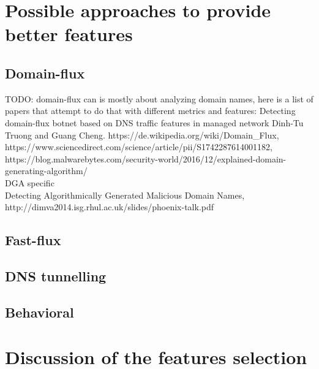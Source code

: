 \section{Possible approaches to provide better features}
\subsection{Domain-flux}
TODO: domain-flux can is mostly about analyzing domain names, here is a list of papers that attempt to do that with different metrics and features:  Detecting domain-flux botnet based on DNS traffic features in managed network Dinh-Tu Truong and Guang Cheng. https://de.wikipedia.org/wiki/Domain\_Flux, https://www.sciencedirect.com/science/article/pii/S1742287614001182, https://blog.malwarebytes.com/security-world/2016/12/explained-domain-generating-algorithm/\\
DGA specific\\
Detecting Algorithmically Generated Malicious Domain Names, http://dimva2014.isg.rhul.ac.uk/slides/phoenix-talk.pdf
\subsection{Fast-flux}
\subsection{DNS tunnelling}
\subsection{Behavioral}

\section{Discussion of the features selection}